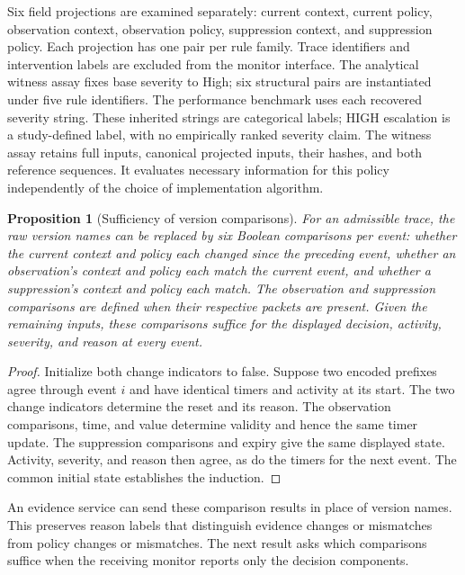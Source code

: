 \documentclass[preprint,11pt]{elsarticle}
\newtheorem{proposition}{Proposition}
\begin{document}
Six field projections are examined separately: current context, current policy, observation context, observation policy, suppression context, and suppression policy. Each projection has one pair per rule family. Trace identifiers and intervention labels are excluded from the monitor interface. The analytical witness assay fixes base severity to High; six structural pairs are instantiated under five rule identifiers. The performance benchmark uses each recovered severity string. These inherited strings are categorical labels; HIGH escalation is a study-defined label, with no empirically ranked severity claim. The witness assay retains full inputs, canonical projected inputs, their hashes, and both reference sequences. It evaluates necessary information for this policy independently of the choice of implementation algorithm.

\begin{proposition}[Sufficiency of version comparisons]
For an admissible trace, the raw version names can be replaced by six Boolean comparisons per event: whether the current context and policy each changed since the preceding event, whether an observation's context and policy each match the current event, and whether a suppression's context and policy each match. The observation and suppression comparisons are defined when their respective packets are present. Given the remaining inputs, these comparisons suffice for the displayed decision, activity, severity, and reason at every event.
\end{proposition}
\begin{proof}
Initialize both change indicators to false. Suppose two encoded prefixes agree through event $i$ and have identical timers and activity at its start. The two change indicators determine the reset and its reason. The observation comparisons, time, and value determine validity and hence the same timer update. The suppression comparisons and expiry give the same displayed state. Activity, severity, and reason then agree, as do the timers for the next event. The common initial state establishes the induction.
\end{proof}
An evidence service can send these comparison results in place of version names. This preserves reason labels that distinguish evidence changes or mismatches from policy changes or mismatches. The next result asks which comparisons suffice when the receiving monitor reports only the decision components. 
\end{document}
